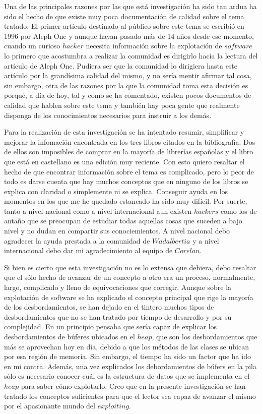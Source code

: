 \documentclass [titlepage, 12pt]{article}
\begin{document}
Una de las principales razones por las que est\'a investigaci\'on ha sido tan ardua ha sido el hecho de que existe muy poca documentaci\'on de calidad sobre el tema tratado. El primer art\'iculo destinado al p\'ublico sobre este tema se escribi\'o en 1996 por Aleph One y aunque hayan pasado m\'as de 14 a\~nos desde ese momento, cuando un curioso $hacker$ necesita informaci\'on sobre la explotaci\'on de $software$ lo primero que acostumbra a realizar la comunidad es dirigirlo hac\'ia la lectura del art\'iculo de Aleph One. Pudiera ser que la comunidad lo dirigiera hasta este art\'iculo por la grand\'isima calidad del mismo, y no ser\'ia mentir afirmar tal cosa, sin embargo, otra de las razones por la que la comunidad toma esta decisi\'on es porqu\'e, a d\'ia de hoy, tal y como se ha comentado, existen pocos documentos de calidad que hablen sobre este tema y tambi\'en hay poca gente que realmente disponga de los conocimientos necesarios para instruir a los dem\'as.\bigskip

Para la realizaci\'on de esta investigaci\'on se ha intentado resumir, simplificar y mejorar la infomaci\'on encontrada en los tres libros citados en la bibliograf\'ia. Dos de ellos son imposibles de comprar en la mayor\'ia de librer\'ias espa\~nolas y el libro que est\'a en castellano es una edici\'on muy reciente. Con esto quiero resaltar el hecho de que encontrar informaci\'on sobre el tema es complicado, pero lo peor de todo es darse cuenta que hay muchos conceptos que en ninguno de los libros se explica con claridad o simplemente ni se explica. Conseguir ayuda en los momentos en los que me he quedado estancado ha sido muy dif\'icil. Por suerte, tanto a nivel nacional como a nivel internacional aun existen $hackers$ como los de anta\~no que se preocupan de estudiar todas aquellas cosas que suceden a bajo nivel y no dudan en compartir sus conociemientos. A nivel nacional debo agradecer la ayuda prestada a la comunidad de $Wadalbertia$ y a nivel internacional debo dar mi agradecimiento al equipo de $Corelan$.  \bigskip

Si bien es cierto que esta investigaci\'on no es lo extensa que debiera, debo resaltar que el s\'olo hecho de avanzar de un concepto a otro era un proceso, normalmente, largo, complicado y lleno de equivocaciones que corregir. Aunque sobre la explotaci\'on de software se ha explicado el concepto principal que rige la mayor\'ia de los desbordamientos, se han dejado en el tintero muchos tipos de desbordamientos que no se han tratado por tiempo de desarrollo y por su complejidad. En un principio pensaba que ser\'ia capaz de explicar los desbordamientos de b\'uferes ubicados en el $heap$, que son los desbordamientos que m\'as se aprovechan hoy en d\'ia, debido a que los m\'etodos de las clases se ubican por esa regi\'on de memoria. Sin embargo, el tiempo ha sido un factor que ha ido en mi contra. Adem\'as, una vez explicados los debordamientos de b\'ufers en la pila s\'olo es necesario conocer cu\'al es la estructura de datos que se implementa en el $heap$ para saber c\'omo explotarlo. Creo que en la presente investigaci\'on se han tratado los conceptos suficientes para que el lector sea capaz de avanzar el mismo por el apasionante mundo del $exploiting$. \bigskip
\end{document}

